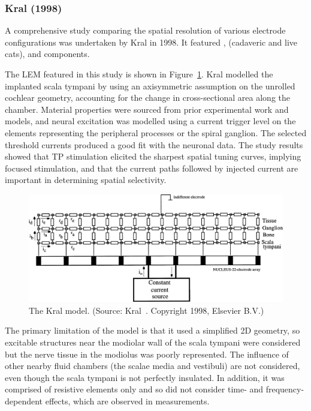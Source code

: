 \subsubsection{Kral \etal{} (1998)}

A comprehensive study comparing the spatial resolution of various electrode
configurations was undertaken by Kral \etal{} in 1998. It featured \invitro,
\invivo{} (cadaveric and live cats), and \insilico{} components.

The LEM featured in this study is shown in Figure~\ref{fig:model_kral}. Kral
\etal{} modelled the implanted scala tympani by using an axisymmetric assumption
on the unrolled cochlear geometry, accounting for the change in cross-sectional
area along the chamber. Material properties were sourced from prior experimental
work and models, and neural excitation was modelled using a current trigger
level on the elements representing the peripheral processes or the spiral
ganglion. The selected threshold currents produced a good fit with the \invivo{}
neuronal data. The study results showed that TP stimulation elicited the
sharpest spatial tuning curves, implying focused stimulation, and that the
current paths followed by injected current are important in determining spatial
selectivity.

\begin{figure}
	\centering
	\includegraphics[width=\textwidth]{Background/kral}
	\caption[The Kral model]{The Kral model. (Source: Kral~\cite{kral1998}.
	Copyright \textcopyright{} 1998, Elsevier B.V.)}
	\label{fig:model_kral}
\end{figure}

The primary limitation of the model is that it used a simplified 2D geometry, so
excitable structures near the modiolar wall of the scala tympani were considered
but the nerve tissue in the modiolus was poorly represented. The influence of
other nearby fluid chambers (the scalae media and vestibuli) are not considered,
even though the scala tympani is not perfectly insulated. In addition, it was
comprised of resistive elements only and so did not consider time- and
frequency-dependent effects, which are observed in \invivo{} measurements.

